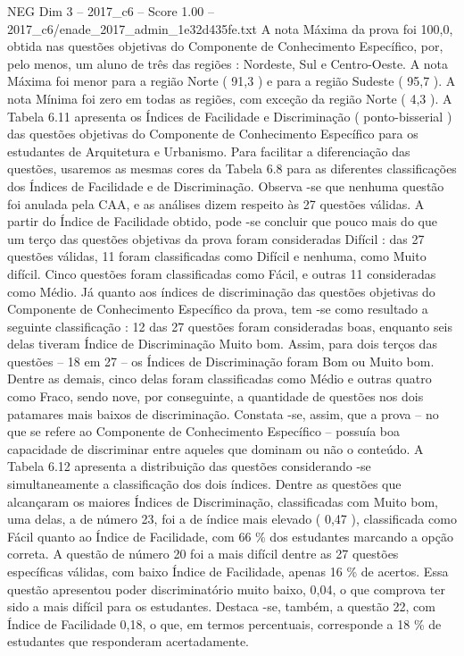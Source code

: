 \begin{textsample}{NEG Dim 3 – 2017\_c6 – Score 1.00 – 2017\_c6/enade\_2017\_admin\_1e32d435fe.txt}
A nota Máxima da prova foi 100,0, obtida nas questões objetivas do Componente de Conhecimento Específico, por, pelo menos, um aluno de três das regiões : Nordeste, Sul e Centro-Oeste.
A nota Máxima foi menor para a região Norte ( 91,3 ) e para a região Sudeste ( 95,7 ).
A nota Mínima foi zero em todas as regiões, com exceção da região Norte ( 4,3 ).
A Tabela 6.11 apresenta os Índices de Facilidade e Discriminação ( ponto-bisserial ) das questões objetivas do Componente de Conhecimento Específico para os estudantes de Arquitetura e Urbanismo.
Para facilitar a diferenciação das questões, usaremos as mesmas cores da Tabela 6.8 para as diferentes classificações dos Índices de Facilidade e de Discriminação.
Observa -se que nenhuma questão foi anulada pela CAA, e as análises dizem respeito às 27 questões válidas.
A partir do Índice de Facilidade obtido, pode -se concluir que pouco mais do que um terço das questões objetivas da prova foram consideradas Difícil : das 27 questões válidas, 11 foram classificadas como Difícil e nenhuma, como Muito difícil.
Cinco questões foram classificadas como Fácil, e outras 11 consideradas como Médio.
Já quanto aos índices de discriminação das questões objetivas do Componente de Conhecimento Específico da prova, tem -se como resultado a seguinte classificação : 12 das 27 questões foram consideradas boas, enquanto seis delas tiveram Índice de Discriminação Muito bom.
Assim, para dois terços das questões – 18 em 27 – os Índices de Discriminação foram Bom ou Muito bom.
Dentre as demais, cinco delas foram classificadas como Médio e outras quatro como Fraco, sendo nove, por conseguinte, a quantidade de questões nos dois patamares mais baixos de discriminação.
Constata -se, assim, que a prova – no que se refere ao Componente de Conhecimento Específico – possuía boa capacidade de discriminar entre aqueles que dominam ou não o conteúdo.
A Tabela 6.12 apresenta a distribuição das questões considerando -se simultaneamente a classificação dos dois índices.
Dentre as questões que alcançaram os maiores Índices de Discriminação, classificadas com Muito bom, uma delas, a de número 23, foi a de índice mais elevado ( 0,47 ), classificada como Fácil quanto ao Índice de Facilidade, com 66 \% dos estudantes marcando a opção correta.
A questão de número 20 foi a mais difícil dentre as 27 questões específicas válidas, com baixo Índice de Facilidade, apenas 16 \% de acertos.
Essa questão apresentou poder discriminatório muito baixo, 0,04, o que comprova ter sido a mais difícil para os estudantes.
Destaca -se, também, a questão 22, com Índice de Facilidade 0,18, o que, em termos percentuais, corresponde a 18 \% de estudantes que responderam acertadamente.

\end{textsample}

